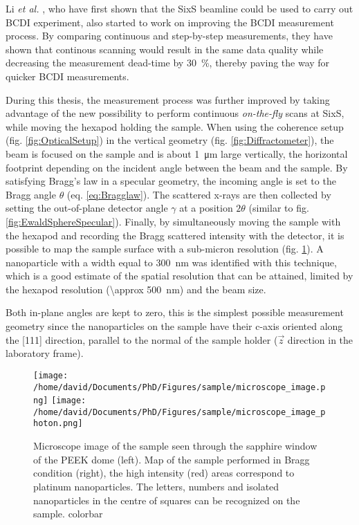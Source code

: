 Li \textit{et al.} \parencite*{Li2020}, who have first shown that the SixS beamline could be used to carry out BCDI experiment, also started to work on improving the BCDI measurement process.
By comparing continuous and step-by-step measurements, they have shown that continous scanning would result in the same data quality while decreasing the measurement dead-time by \qty{30}{\percent}, thereby paving the way for quicker BCDI measurements.

During this thesis, the measurement process was further improved by taking advantage of the new possibility to perform continuous \textit{on-the-fly} scans at SixS, while moving the hexapod holding the sample.
When using the coherence setup (fig. \ref{fig:OpticalSetup}) in the vertical geometry (fig. \ref{fig:Diffractometer}), the beam is focused on the sample and is about \qty{1}{\um} large vertically, the horizontal footprint depending on the incident angle between the beam and the sample.
By satisfying Bragg's law in a specular geometry, the incoming angle is set to the Bragg angle $\theta$ (eq. \ref{eq:Bragglaw}).
The scattered x-rays are then collected by setting the out-of-plane detector angle $\gamma$ at a position $2\theta$ (similar to fig. \ref{fig:EwaldSphereSpecular}).
Finally, by simultaneously moving the sample with the hexapod and recording the Bragg scattered intensity with the detector, it is possible to map the sample surface with a sub-micron resolution (fig. \ref{fig:SampleMapping}).
A nanoparticle with a width equal to \qty{300}{\nm} was identified with this technique, which is a good estimate of the spatial resolution that can be attained, limited by the hexapod resolution (\qty{\approx 500}{\nm}) and the beam size.

Both in-plane angles are kept to zero, this is the simplest possible measurement geometry since the nanoparticles on the sample have their c-axis oriented along the [111] direction, parallel to the normal of the sample holder ($\vec{z}$ direction in the laboratory frame).

\begin{figure}[!htb]
    \centering
    \texttt{[image: /home/david/Documents/PhD/Figures/sample/microscope\_image.png]}
    \texttt{[image: /home/david/Documents/PhD/Figures/sample/microscope\_image\_photon.png]}
    \caption{
        Microscope image of the sample seen through the sapphire window of the PEEK dome (left).
        Map of the sample performed in Bragg condition (right), the high intensity (red) areas correspond to platinum nanoparticles.
        The letters, numbers and isolated nanoparticles in the centre of squares can be recognized on the sample.
        \textcolor{Important}{colorbar}
    }
    \label{fig:SampleMapping}
\end{figure}


